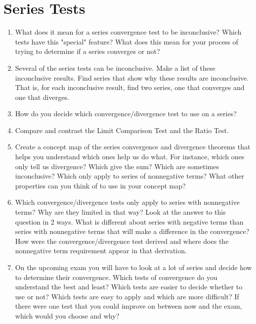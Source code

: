 \section{Series Tests}
\begin{enumerate}

\item What does it mean for a series convergence test to be inconclusive?  Which tests have this "special" feature?  What does this mean for your process of trying to determine if a series converges or not?

\item Several of the series tests can be inconclusive.  Make a list of these inconclusive results.  Find series that show why these results are inconclusive.  That is, for each inconclusive result, find two series, one that converges and one that diverges.

\item How do you decide which convergence/divergence test to use on a series?  

\item Compare and contrast the Limit Comparison Test and the Ratio Test.

\item Create a concept map of the series convergence and divergence theorems that helps you understand which ones help us do what.  For instance, which ones only tell us divergence?  Which give the sum?  Which are sometimes inconclusive?  Which only apply to series of nonnegative terms?  What other properties can you think of to use in your concept map?

\item Which convergence/divergence tests only apply to series with nonnegative terms?  Why are they limited in that way?  Look at the answer to this question in 2 ways.  What is different about series with negative terms than series with nonnegative terms that will make a difference in the convergence?  How were the convergence/divergence test derived and where does the nonnegative term requirement appear in that derivation.

\item On the upcoming exam you will have to look at a lot of series and decide how to determine their convergence.  Which tests of convergence do you understand the best and least?  Which tests are easier to decide whether to use or not?  Which tests are easy to apply and which are more difficult?  If there were one test that you could improve on between now and the exam, which would you choose and why?


\end{enumerate}
